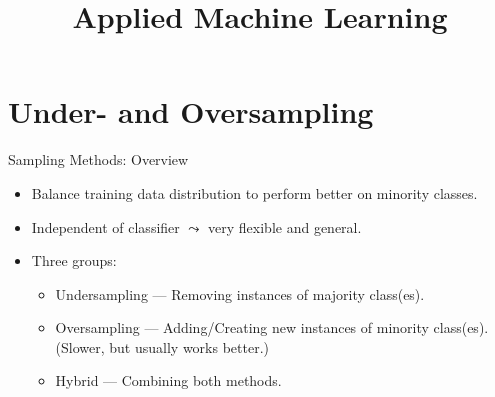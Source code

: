 \documentclass[11pt,compress,t,notes=noshow, xcolor=table]{beamer}
\title{Applied Machine Learning}
\date{}
\begin{document}


%
\section{Under- and Oversampling}

\begin{frame}{Sampling Methods: Overview}
    \small{
		\begin{itemize}
			\item Balance training data distribution to perform better on minority classes.
			
			\item Independent of classifier $\leadsto$ very flexible and general.
   
			\item Three groups: 
		
			\begin{minipage}{0.59\textwidth}
				\begin{itemize} 
                    \small
                    
					\item Undersampling --- Removing instances of majority class(es).
			
					\item Oversampling --- Adding/Creating new instances of minority class(es).  (Slower, but usually works better.)


					\item Hybrid --- Combining both methods.
			

\end{itemize}
\end{minipage}
\end{itemize}}
\end{frame}
\end{document}
